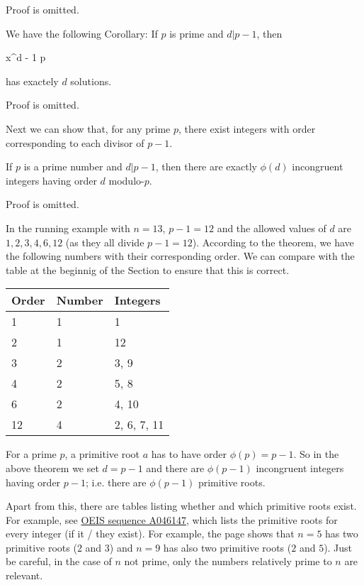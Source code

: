 Proof is omitted.

We have the following Corollary: If $p$ is prime and $d | p-1$, then

\bee
x^d - 1  \mod p
\eee

has exactely $d$ solutions.

Proof is omitted.

Next we can show that, for any prime $p$, there exist integers with order corresponding to each divisor of $p-1$.

\begin{theorem}
  If $p$ is a prime number and $d | p-1$, then there are exactly $\phi(d)$ incongruent integers having order $d$ modulo-$p$.
\end{theorem}

Proof is omitted.

In the running example with $n=13$, $p-1 = 12$ and the allowed values of $d$ are $1,2,3,4,6, 12$ (as they all divide $p-1=12$). According to the theorem, we have the following numbers with their corresponding order. We can compare with the table %
at the beginnig of the Section to ensure that this is correct.

\vspace*{2mm}

\begin{tabular}{lll}
  Order & Number & Integers \\ \hline
  1     & 1      & 1        \\
  2     & 1      & 12       \\
  3     & 2      & 3, 9     \\
  4     & 2      & 5, 8     \\
  6     & 2      & 4, 10    \\
  12    & 4      & 2, 6, 7, 11
\end{tabular}

\vspace*{2mm}

For a prime $p$, a primitive root $a$ has to have order $\phi(p) = p-1$. So in the above theorem we set $d=p-1$ and there are $\phi(p-1)$ incongruent integers having order $p-1$; i.e. there are $\phi(p-1)$ primitive roots.


Apart from this, there are tables listing whether and which primitive roots exist. For example, see \href{http://oeis.org/A046147}{OEIS sequence A046147}, which lists the primitive roots for every integer (if it / they exist). For example, the page shows that $n=5$ has two primitive roots ($2$ and $3$) and $n=9$ has also two primitive roots ($2$ and $5$). Just be careful, in the case of $n$ not prime, only the numbers relatively prime to $n$ are relevant.

